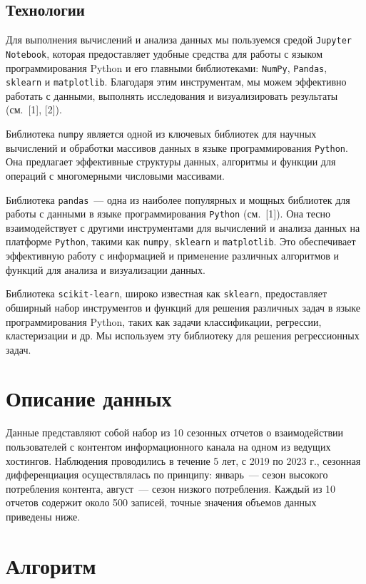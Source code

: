 \documentclass[a4paper,12pt]{article}
\begin{document}
\subsection{Технологии}
Для выполнения вычислений и анализа данных мы пользуемся средой \texttt{Jupyter Notebook}, которая предоставляет удобные средства для работы с языком программирования Python и его главными библиотеками: \texttt{NumPy}, \texttt{Pandas}, \texttt{sklearn} и \texttt{matplotlib}. Благодаря этим инструментам, мы можем эффективно работать с данными, выполнять исследования и визуализировать результаты (см. [1], [2]).

Библиотека \texttt{numpy} является одной из ключевых библиотек для научных вычислений и обработки массивов данных в языке программирования \texttt{Python}. Она предлагает эффективные структуры данных, алгоритмы и функции для операций с многомерными числовыми массивами.

Библиотека \texttt{pandas}~--- одна из наиболее популярных и мощных библиотек для работы с данными в языке программирования \texttt{Python} (см. [1]). Она тесно взаимодействует с другими инструментами для вычислений и анализа данных на платформе \texttt{Python}, такими как \texttt{numpy}, \texttt{sklearn} и \texttt{matplotlib}. Это обеспечивает эффективную работу с информацией и применение различных алгоритмов и функций для анализа и визуализации данных.

Библиотека \texttt{scikit-learn}, широко известная как \texttt{sklearn}, предоставляет обширный набор инструментов и функций для решения различных задач в языке программирования Python, таких как задачи классификации, регрессии, кластеризации и др. Мы используем эту библиотеку для решения регрессионных задач.

\section{Описание данных}
Данные представляют собой набор из 10 сезонных отчетов о взаимодействии пользователей с контентом информационного канала на одном из ведущих хостингов. Наблюдения проводились в течение 5 лет, с 2019 по 2023 г., сезонная дифференциация осуществлялась по принципу: январь~--- сезон высокого потребления контента, август~--- сезон низкого потребления. Каждый из 10 отчетов содержит около 500 записей, точные значения объемов данных приведены ниже.

\section{Алгоритм}
\end{document}
